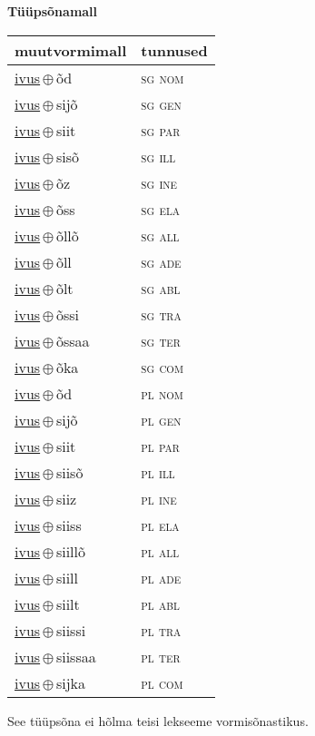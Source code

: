 

\vspace{3.5em}
\noindent \begin{minipage}{\textwidth}
\noindent \textbf{Tüüpsõnamall \,}\\

\begin{sideways}
\begin{tabular}{l l}
muutvormimall & tunnused \\
\hline
\underline{ivus}\,$\oplus$\,õd & \textsc{ sg nom } \\
\underline{ivus}\,$\oplus$\,sijõ & \textsc{ sg gen } \\
\underline{ivus}\,$\oplus$\,siit & \textsc{ sg par } \\
\underline{ivus}\,$\oplus$\,sisõ & \textsc{ sg ill } \\
\underline{ivus}\,$\oplus$\,õz & \textsc{ sg ine } \\
\underline{ivus}\,$\oplus$\,õss & \textsc{ sg ela } \\
\underline{ivus}\,$\oplus$\,õllõ & \textsc{ sg all } \\
\underline{ivus}\,$\oplus$\,õll & \textsc{ sg ade } \\
\underline{ivus}\,$\oplus$\,õlt & \textsc{ sg abl } \\
\underline{ivus}\,$\oplus$\,õssi & \textsc{ sg tra } \\
\underline{ivus}\,$\oplus$\,õssaa & \textsc{ sg ter } \\
\underline{ivus}\,$\oplus$\,õka & \textsc{ sg com } \\
\underline{ivus}\,$\oplus$\,õd & \textsc{ pl nom } \\
\underline{ivus}\,$\oplus$\,sijõ & \textsc{ pl gen } \\
\underline{ivus}\,$\oplus$\,siit & \textsc{ pl par } \\
\underline{ivus}\,$\oplus$\,siisõ & \textsc{ pl ill } \\
\underline{ivus}\,$\oplus$\,siiz & \textsc{ pl ine } \\
\underline{ivus}\,$\oplus$\,siiss & \textsc{ pl ela } \\
\underline{ivus}\,$\oplus$\,siillõ & \textsc{ pl all } \\
\underline{ivus}\,$\oplus$\,siill & \textsc{ pl ade } \\
\underline{ivus}\,$\oplus$\,siilt & \textsc{ pl abl } \\
\underline{ivus}\,$\oplus$\,siissi & \textsc{ pl tra } \\
\underline{ivus}\,$\oplus$\,siissaa & \textsc{ pl ter } \\
\underline{ivus}\,$\oplus$\,sijka & \textsc{ pl com } \\
\end{tabular}
\end{sideways}
\label{tab:tüüpsõnamall-ivusõd}

\end{minipage}

 
\vspace{1em}
\noindent See tüüpsõna ei hõlma teisi lekseeme vormi\-sõnastikus.
